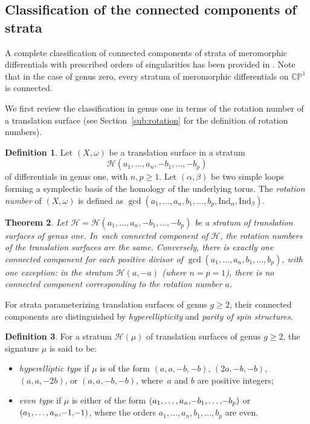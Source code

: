 \documentclass[JEP,XML,SOM,Unicode,NoFloatCountersInSection,published]{cedram}
\newtheorem{thm}{Theorem}[section]
\theoremstyle{definition}
\newtheorem{defn}[thm]{Definition}
\begin{document}
\subsection{Classification of the connected components of strata}\label{sub:CCClassification}

A complete classification of connected components of strata of meromorphic differentials with prescribed orders of singularities has been provided in \cite{Bo}. Note that in the case of genus zero, every stratum of meromorphic differentials on $\mathbb C\mathbb P^1$ is connected.

We first review the classification in genus one in terms of the rotation number of a translation surface (see Section~\ref{sub:rotation} for the definition of rotation numbers).

\begin{defn}
Let $(X,\omega)$ be a translation surface in a stratum
\[
\mathcal{H}(a_{1},\dots,a_{n},-b_{1},\dots,-b_{p})
\]
of differentials in genus one, with $n,p \geq 1$. Let $(\alpha,\beta)$ be two simple loops forming a symplectic basis of the homology of the underlying torus. The \textit{rotation number} of $(X,\omega)$ is defined as $\gcd(a_{1},\dots,a_{n},b_{1},\dots,b_{p},\mathrm{Ind}_{\alpha},\mathrm{Ind}_{\beta})$.
\end{defn}

\begin{thm}\label{thm:BoissyGenusOne}
Let $\mathcal{H}=\mathcal{H}(a_{1},\dots,a_{n},-b_{1},\dots,-b_{p})$ be a stratum of translation surfaces of genus one. In~each connected component of $\mathcal{H}$, the rotation numbers of the translation surfaces are the same. Conversely, there is exactly one connected component for each positive divisor of $\gcd(a_{1},\dots,a_{n},b_{1},\dots,b_{p})$, with one exception: in the stratum $\mathcal{H}(a,-a)$ (where $n=p=1$), there is no connected component corresponding to the rotation number $a$.
\end{thm}

For strata parameterizing translation surfaces of genus $g \geq 2$, their connected components are distinguished by \textit{hyperellipticity} and \textit{parity of spin structures}.

\begin{defn}
For a stratum $\mathcal{H}(\mu)$ of translation surfaces of genus $g \geq 2$, the signature $\mu$ is said to be:
\begin{itemize}
\item \textit{hyperelliptic type} if $\mu$ is of the form $(a,a,-b,-b)$, $(2a,-b,-b)$, $(a,a,-2b)$, or $(a,a,-b,-b)$, where~$a$ and $b$ are positive integers;
\item \textit{even type} if $\mu$ is either of the form $(a_{1},\dots,a_{n},\mkern-3mu -b_{1},\dots,\mkern-3mu -b_{p})$ or $(a_{1},\dots,a_{n},\mkern-3mu-1,\mkern-3mu -1)$, where the orders $a_{1},\dots,a_{n},b_{1},\dots,b_{p}$ are even.
\end{itemize}
\end{defn}
\end{document}
